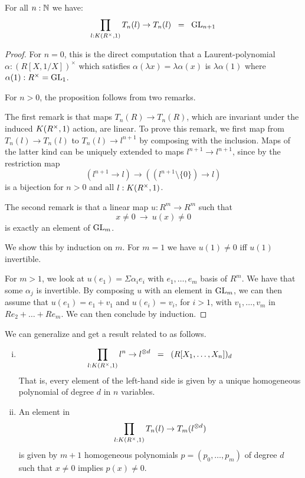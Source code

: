 \begin{proposition}\label{aut}
  For all $n:\mathbb{N}$ we have:
$$\prod_{l:K(R^{\times},1)}T_n(l)\rightarrow T_n(l) \;\;=\;\; \operatorname{GL}_{n+1}$$
\end{proposition}

\begin{proof}
  For $n=0$, this is the direct computation that a Laurent-polynomial $\alpha:(R[X,1/X])^\times$ which satisfies
  $\alpha(\lambda x)=\lambda \alpha(x)$ is $\lambda\alpha(1)$ where $\alpha(1):R^\times=\operatorname{GL}_1$.
  
  \medskip
  
  For $n>0$, the proposition follows from two remarks.

  The first remark is that maps $T_n(R)\to T_n(R)$, which are invariant under the induced $K(R^{\times},1)$ action, are linear.
  To prove this remark, we first map from $T_n(l)\to T_n(l)$ to $T_n(l)\to l^{n+1}$ by composing with the inclusion.
  Maps of the latter kind can be uniquely extended to maps $l^{n+1}\to l^{n+1}$, since by 
   the restriction map
$$
(l^{n+1}\rightarrow l)\rightarrow ((l^{n+1}\setminus\{0\})\rightarrow l)
$$
is a bijection for $n>0$ and all $l:K(R^{\times},1)$.

\medskip

The second remark is that a linear map $u:R^{m}\rightarrow R^{m}$ such that
$$
x\neq 0~\rightarrow~u(x)\neq 0
$$
is exactly an element of $\operatorname{GL}_{m}$.

We show this by induction on $m$. For $m=1$ we have $u(1)\neq 0$ iff $u(1)$ invertible.

For $m>1$, we look at $u(e_1) = \Sigma \alpha_ie_i$ with $e_1,\dots,e_m$ basis of $R^m$.
We have that some $\alpha_j$ is invertible.
By composing $u$ with an element in $\operatorname{GL}_m$, we can then
assume that $u(e_1) = e_1+v_1$ and $u(e_i) = v_i$, for $i>1$, with $v_1,\dots,v_m$ in $Re_2+\dots+Re_m$.
We can then conclude by induction.
\end{proof}

We can generalize 
and get a result related to  as follows.
 
\begin{lemma}\label{hom}
  \begin{enumerate}[(i)]
    \item
      \[  \prod_{l:K(R^{\times},1)}l^n\rightarrow l^{\otimes d} \;\;=\;\; (R[X_1, \dots, X_n])_d \]
      That is,
      every element of the left-hand side is given by
      a unique homogeneous polynomial of degree $d$ in $n$ variables.
    \item
      An element in
      $$\prod_{l:K(R^{\times},1)}T_n(l)\rightarrow T_m(l^{\otimes d})$$
      is given by $m+1$ homogeneous polynomials $p = (p_0,\dots,p_m)$ of degree $d$ such that
      $x\neq 0$ implies $p(x)\neq 0$.
  \end{enumerate}
\end{lemma}

